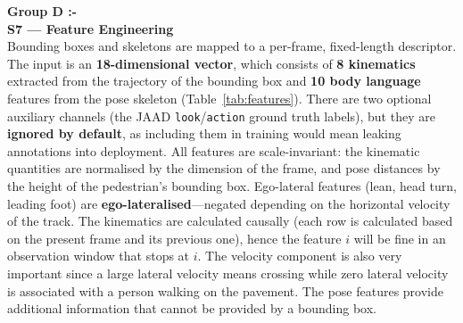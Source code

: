 \documentclass[conference]{IEEEtran}
\begin{document}
\vspace{8pt}
\noindent\textbf{Group D :- }
\mbox{}\\
\textbf{S7 --- Feature Engineering} \\
Bounding boxes and skeletons are mapped to a per-frame, fixed-length descriptor. The input is an \textbf{18-dimensional vector}, which consists of \textbf{8 kinematics} extracted from the trajectory of the bounding box and \textbf{10 body language} features from the pose skeleton (Table~\ref{tab:features}). There are two optional auxiliary channels (the JAAD \texttt{look}/\texttt{action} ground truth labels), but they are \textbf{ignored by default}, as including them in training would mean leaking annotations into deployment. All features are scale-invariant: the kinematic quantities are normalised by the dimension of the frame, and pose distances by the height of the pedestrian's bounding box. Ego-lateral features (lean, head turn, leading foot) are \textbf{ego-lateralised}---negated depending on the horizontal velocity of the track.
The kinematics are calculated causally (each row is calculated based on the present frame and its previous one), hence the feature $i$ will be fine in an observation window that stops at $i$. The velocity component is also very important since a large lateral velocity means crossing while zero lateral velocity is associated with a person walking on the pavement. The pose features provide additional information that cannot be provided by a bounding box.
\end{document}
